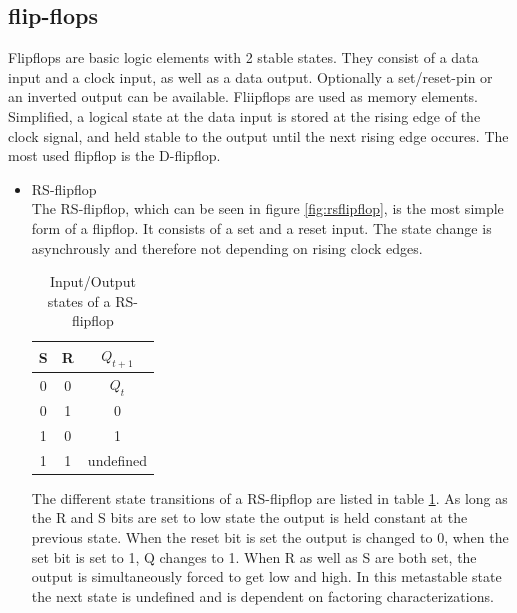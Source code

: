 \subsection{flip-flops}
Flipflops are basic logic elements with 2 stable states. They consist of a data input and a clock input, as well as a data output. Optionally a set/reset-pin or an inverted output can be available. Fliipflops are used as memory elements. Simplified, a logical state at the data input is stored at the rising edge of the clock signal, and held stable to the output until the next rising edge occures. The most used flipflop is the D-flipflop.
\begin{itemize}
\item RS-flipflop\\
The RS-flipflop, which can be seen in figure \ref{fig:rsflipflop}, is the most simple form of a flipflop. It consists of a set and a reset input. The state change is asynchrously and therefore not depending on rising clock edges. 

\begin{table}
\begin{center}
\begin{tabular}{|c|c||c|}
\hline
S &  R & $Q_{t+1}$\\
\hline\hline
0 & 0 & $Q_{t}$\\
\hline
0 & 1 & 0\\
\hline
1 & 0 & 1\\
\hline
1 & 1 & undefined\\
\hline
\end{tabular}
\caption{Input/Output states of a RS-flipflop}
\label{tab:rsstates}
\end{center}
\end{table}

The different state transitions of a RS-flipflop are listed in table \ref{tab:rsstates}. As long as the R and S bits are set to low state the output is held constant at the previous state. When the reset bit is set the output is changed to 0, when the set bit is set to 1, Q changes to 1. When R as well as S are both set, the output is simultaneously forced to get low and high. In this metastable state the next state is undefined and is dependent on factoring characterizations.


\end{itemize}
